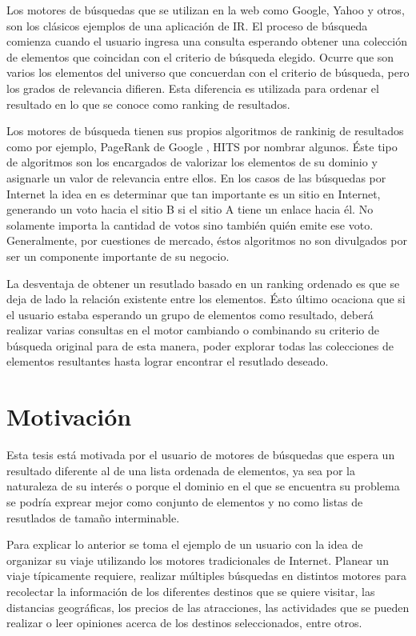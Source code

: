 Los motores de búsquedas que se utilizan en la web como Google, Yahoo y otros, son los clásicos ejemplos de una aplicación de IR. El proceso de búsqueda comienza cuando el usuario ingresa una consulta esperando obtener una colección de elementos que coincidan con el criterio de búsqueda elegido. Ocurre que son varios los elementos del universo que concuerdan con el criterio de búsqueda, pero los grados de relevancia difieren. Esta diferencia es utilizada para ordenar el resultado en lo que se conoce como ranking de resultados.

Los motores de búsqueda tienen sus propios algoritmos de rankinig de resultados como por ejemplo, PageRank de Google \cite{Brin:1998:ALH:297810.297827}, HITS \cite{Kleinberg:1999:ASH:324133.324140} por nombrar algunos. Éste tipo de algoritmos son los encargados de valorizar los elementos de su dominio y asignarle un valor de relevancia entre ellos. En los casos de las búsquedas por Internet la idea en \cite{Brin:1998:ALH:297810.297827} es determinar que tan importante es un sitio en Internet, generando un voto hacia el sitio B si el sitio A tiene un enlace hacia él. No solamente importa la cantidad de votos sino también quién emite ese voto. Generalmente, por cuestiones de mercado, éstos algoritmos no son divulgados por ser un componente importante de su negocio. 

La desventaja de obtener un resutlado basado en un ranking ordenado es que se deja de lado la relación existente entre los elementos. Ésto último ocaciona que si el usuario estaba esperando un grupo de elementos como resultado, deberá realizar varias consultas en el motor cambiando o combinando su criterio de búsqueda original para de esta manera, poder explorar todas las colecciones de elementos resultantes hasta lograr encontrar el resutlado deseado.

\section{Motivación}
Esta tesis está motivada por el usuario de motores de búsquedas que espera un resultado diferente al de una lista ordenada de elementos, ya sea por la naturaleza de su interés o porque el dominio en el que se encuentra su problema se podría exprear mejor como conjunto de elementos y no como listas de resutlados de tamaño interminable.

Para explicar lo anterior se toma el ejemplo de un usuario con la idea de organizar su viaje utilizando los motores tradicionales de Internet. Planear un viaje típicamente requiere, realizar múltiples búsquedas en distintos motores para recolectar la información de los diferentes destinos que se quiere visitar, las distancias geográficas, los precios de las atracciones, las actividades que se pueden realizar o leer opiniones acerca de los destinos seleccionados, entre otros.

